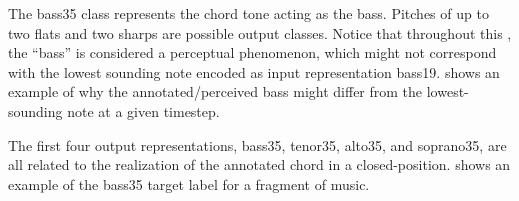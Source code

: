 
The \gls{bass35} class represents the chord tone acting as
the bass. Pitches of up to two flats and two sharps are
possible output classes. Notice that throughout this
\thesisdiss{}, the ``bass'' is considered a perceptual
phenomenon, which might not correspond with the lowest
sounding note encoded as input representation \gls{bass19}.
 shows an example of why
the annotated/perceived bass might differ from the
lowest-sounding note at a given timestep.


The first four output representations, \gls{bass35},
\gls{tenor35}, \gls{alto35}, and \gls{soprano35}, are all
related to the realization of the annotated chord in a
\gls{closed-position}.  shows
an example of the \gls{bass35} target label for a fragment
of music.

